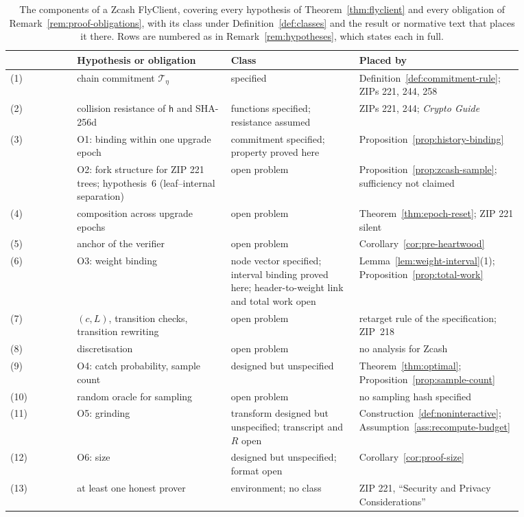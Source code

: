 \documentclass[11pt,a4paper]{article}
\theoremstyle{definition}
\begin{document}
\begin{table}[tbp]
\centering
\footnotesize
\renewcommand{\arraystretch}{1.15}
\begin{tabular}{@{}l p{0.30\linewidth} p{0.25\linewidth}
  p{0.32\linewidth}@{}}
\toprule
& Hypothesis or obligation & Class & Placed by \\
\midrule
(1) & \raggedright chain commitment $\mathcal{T}_\eta$
  & \raggedright specified
  & \raggedright Definition~\ref{def:commitment-rule}; ZIPs 221, 244, 258
  \tabularnewline
(2) & \raggedright collision resistance of $\mathsf{h}$ and SHA-256d
  & \raggedright functions specified; resistance assumed
  & \raggedright ZIPs 221, 244; \emph{Crypto Guide} \tabularnewline
(3) & \raggedright O1: binding within one upgrade epoch
  & \raggedright commitment specified; property proved here
  & \raggedright Proposition~\ref{prop:history-binding} \tabularnewline
& \raggedright O2: fork structure for ZIP 221 trees; hypothesis~6
  (leaf--internal separation)
  & \raggedright open problem
  & \raggedright Proposition~\ref{prop:zcash-sample}; sufficiency not
  claimed \tabularnewline
(4) & \raggedright composition across upgrade epochs
  & \raggedright open problem
  & \raggedright Theorem~\ref{thm:epoch-reset}; ZIP 221 silent
  \tabularnewline
(5) & \raggedright anchor of the verifier
  & \raggedright open problem
  & \raggedright Corollary~\ref{cor:pre-heartwood} \tabularnewline
(6) & \raggedright O3: weight binding
  & \raggedright node vector specified; interval binding proved here;
  header-to-weight link and total work open
  & \raggedright Lemma~\ref{lem:weight-interval}(1);
  Proposition~\ref{prop:total-work} \tabularnewline
(7) & \raggedright $(c, L)$, transition checks, transition rewriting
  & \raggedright open problem
  & \raggedright retarget rule of the specification; ZIP~218
  \tabularnewline
(8) & \raggedright discretisation
  & \raggedright open problem
  & \raggedright no analysis for Zcash \tabularnewline
(9) & \raggedright O4: catch probability, sample count
  & \raggedright designed but unspecified
  & \raggedright Theorem~\ref{thm:optimal};
  Proposition~\ref{prop:sample-count} \tabularnewline
(10) & \raggedright random oracle for sampling
  & \raggedright open problem
  & \raggedright no sampling hash specified \tabularnewline
(11) & \raggedright O5: grinding
  & \raggedright transform designed but unspecified; transcript and $R$
  open
  & \raggedright Construction~\ref{def:noninteractive};
  Assumption~\ref{ass:recompute-budget} \tabularnewline
(12) & \raggedright O6: size
  & \raggedright designed but unspecified; format open
  & \raggedright Corollary~\ref{cor:proof-size} \tabularnewline
(13) & \raggedright at least one honest prover
  & \raggedright environment; no class
  & \raggedright ZIP 221, ``Security and Privacy Considerations''
  \tabularnewline
\bottomrule
\end{tabular}
\caption{The components of a Zcash FlyClient, covering every hypothesis of
Theorem~\ref{thm:flyclient} and every obligation of
Remark~\ref{rem:proof-obligations}, with its class under
Definition~\ref{def:classes} and the result or normative text that places it
there. Rows are numbered as in Remark~\ref{rem:hypotheses}, which states each
in full.}
\label{tab:boundary}
\end{table}
\end{document}
